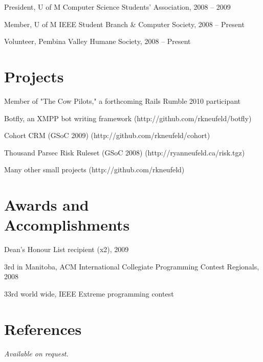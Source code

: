 \documentclass[margin,line,letterpaper]{resume}
\begin{document}
\begin{resume}
  \begin{list2}
    \item President, U of M Computer Science Students' Association, 2008 -- 2009
    \item Member, U of M IEEE Student Branch \& Computer Society, 2008 -- Present
    \item Volunteer, Pembina Valley Humane Society, 2008 -- Present
  \end{list2}

  \section{\mysidestyle Projects}

  \begin{list2}
    \item Member of "The Cow Pilots," a forthcoming Rails Rumble 2010 participant
    \item Botfly, an XMPP bot writing framework (http://github.com/rkneufeld/botfly)
    \item Cohort CRM (GSoC 2009) (http://github.com/rkneufeld/cohort)
    \item Thousand Parsec Risk Ruleset (GSoC 2008) (http://ryanneufeld.ca/risk.tgz)
    \item Many other small projects (http://github.com/rkneufeld)
  \end{list2}

  \section{\mysidestyle Awards and\\Accomplishments}

  \begin{list2}
    \item Dean's Honour List recipient (x2), 2009
    \item 3rd in Manitoba, ACM International Collegiate Programming Contest Regionals, 2008
    \item 33rd world wide, IEEE Extreme programming contest
  \end{list2}

  \section{\mysidestyle References}

  {\sl Available on request.}

\end{resume}
\end{document}
